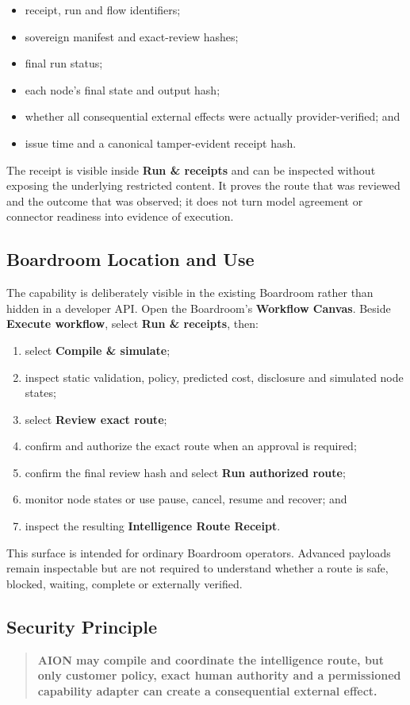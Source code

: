 \begin{itemize}
  \item receipt, run and flow identifiers;
  \item sovereign manifest and exact-review hashes;
  \item final run status;
  \item each node's final state and output hash;
  \item whether all consequential external effects were actually provider-verified; and
  \item issue time and a canonical tamper-evident receipt hash.
\end{itemize}

The receipt is visible inside \textbf{Run \& receipts} and can be inspected without exposing the
underlying restricted content.  It proves the route that was reviewed and the outcome that was
observed; it does not turn model agreement or connector readiness into evidence of execution.

\subsection{Boardroom Location and Use}

The capability is deliberately visible in the existing Boardroom rather than hidden in a developer
API.  Open the Boardroom's \textbf{Workflow Canvas}.  Beside \textbf{Execute workflow}, select
\textbf{Run \& receipts}, then:

\begin{enumerate}
  \item select \textbf{Compile \& simulate};
  \item inspect static validation, policy, predicted cost, disclosure and simulated node states;
  \item select \textbf{Review exact route};
  \item confirm and authorize the exact route when an approval is required;
  \item confirm the final review hash and select \textbf{Run authorized route};
  \item monitor node states or use pause, cancel, resume and recover; and
  \item inspect the resulting \textbf{Intelligence Route Receipt}.
\end{enumerate}

This surface is intended for ordinary Boardroom operators.  Advanced payloads remain inspectable but
are not required to understand whether a route is safe, blocked, waiting, complete or externally
verified.

\subsection{Security Principle}

\begin{quote}
\textbf{AION may compile and coordinate the intelligence route, but only customer policy, exact human
authority and a permissioned capability adapter can create a consequential external effect.}
\end{quote}
